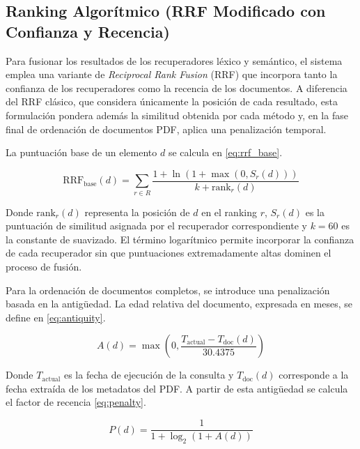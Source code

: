 \documentclass[runningheads]{llncs}
\begin{document}
\subsection{Ranking Algorítmico (RRF Modificado con Confianza y Recencia)}

Para fusionar los resultados de los recuperadores léxico y semántico, 
el sistema emplea una variante de \textit{Reciprocal Rank Fusion} (RRF) que incorpora tanto la 
confianza de los recuperadores como la recencia de los documentos. 
A diferencia del RRF clásico, que considera únicamente la posición de cada resultado, 
esta formulación pondera además la similitud obtenida por cada método y, 
en la fase final de ordenación de documentos PDF, aplica una penalización temporal.

La puntuación base de un elemento $d$ se calcula en \eqref{eq:rrf_base}.

\begin{equation}
    \text{RRF}_{\text{base}}(d) =
    \sum_{r \in R}
    \frac{1 + \ln(1 + \max(0, S_r(d)))}
         {k + \text{rank}_r(d)}
    \label{eq:rrf_base}
\end{equation}

Donde $\text{rank}_r(d)$ representa la posición de $d$ en el ranking $r$, $S_r(d)$ 
es la puntuación de similitud asignada por el recuperador correspondiente y $k=60$ es la constante de suavizado. 
El término logarítmico permite incorporar la confianza de cada recuperador sin que puntuaciones 
extremadamente altas dominen el proceso de fusión.

Para la ordenación de documentos completos, se introduce una penalización basada en la antigüedad. 
La edad relativa del documento, expresada en meses, se define en \eqref{eq:antiquity}.

\begin{equation}
    A(d)=
    \max\left(
        0,
        \frac{T_{\text{actual}}-T_{\text{doc}}(d)}
             {30.4375}
    \right)
    \label{eq:antiquity}
\end{equation}

Donde $T_{\text{actual}}$ es la fecha de ejecución de la consulta y $T_{\text{doc}}(d)$ corresponde a 
la fecha extraída de los metadatos del PDF. 
A partir de esta antigüedad se calcula el factor de recencia \eqref{eq:penalty}.

\begin{equation}
    P(d)=
    \frac{1}
         {1+\log_2(1+A(d))}
    \label{eq:penalty}
\end{equation}
\end{document}

